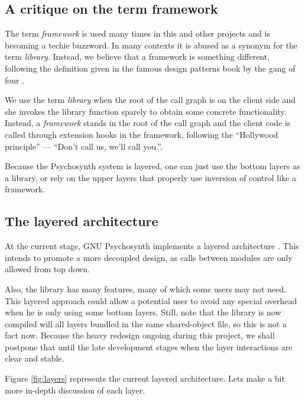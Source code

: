 \subsection{A critique on the term framework}

The term \emph{framework} is used many times in this and other
projects and is becoming a techie buzzword. In many contexts it is
abused as a synonym for the term \emph{library}. Instead, we believe
that a framework is something different, following the definition
given in the famous design patterns book by the gang of
four \cite{gamma95design}.

We use the term \emph{library} when the root of the call graph is on
the client side and she invokes the library function sparely to obtain
some concrete functionality. Instead, a \emph{framework} stands in the
root of the call graph and the client code is called through extension
hooks in the framework, following the ``Hollywood principle'' ---
``Don't call us, we'll call you.''.

Because the Psychosynth system is layered, one can just use the bottom
layers as a library, or rely on the upper layers that properly use
inversion of control like a framework.

\subsection{The layered architecture}

At the current stage, GNU Psychosynth implements a layered
architecture \cite{garlan94software}. This intends to promote a more
decoupled design, as calls between modules are only allowed from top
down.

Also, the library has many features, many of which some users may
not need. This layered approach could allow a potential user to avoid
any special overhead when he is only using some bottom layers. Still,
note that the library is now compiled will all layers bundled in the
same shared-object file, so this is not a fact now. Because the heavy
redesign ongoing during this project, we shall postpone that until the
late development stages when the layer interactions are clear and
stable.

Figure \ref{fig:layers} represents the current layered
architecture. Lets make a bit more in-depth discussion of each layer.

